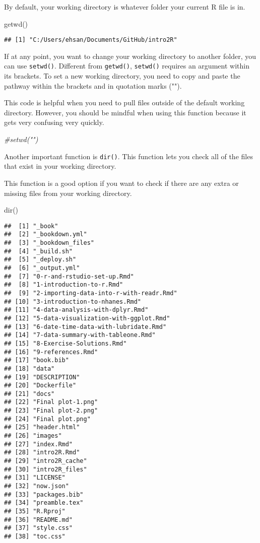 \documentclass[
]{book}
\newenvironment{Shaded}{\begin{snugshade}}{\end{snugshade}}
\newcommand{\CommentTok}[1]{\textcolor[rgb]{0.56,0.35,0.01}{\textit{#1}}}
\newcommand{\FunctionTok}[1]{\textcolor[rgb]{0.00,0.00,0.00}{#1}}
\newcommand{\NormalTok}[1]{#1}
\begin{document}
By default, your working directory is whatever folder your current R file is in.

\begin{Shaded}
\begin{Highlighting}[]
\FunctionTok{getwd}\NormalTok{()}
\end{Highlighting}
\end{Shaded}

\begin{verbatim}
## [1] "C:/Users/ehsan/Documents/GitHub/intro2R"
\end{verbatim}

If at any point, you want to change your working directory to another folder, you can use \texttt{setwd()}. Different from \texttt{getwd()}, \texttt{setwd()} requires an argument within its brackets. To set a new working directory, you need to copy and paste the pathway within the brackets and in quotation marks ("").

This code is helpful when you need to pull files outside of the default working directory. However, you should be mindful when using this function because it gets very confusing very quickly.

\begin{Shaded}
\begin{Highlighting}[]
\CommentTok{\#setwd("")}
\end{Highlighting}
\end{Shaded}

Another important function is \texttt{dir()}. This function lets you check all of the files that exist in your working directory.

This function is a good option if you want to check if there are any extra or missing files from your working directory.

\begin{Shaded}
\begin{Highlighting}[]
\FunctionTok{dir}\NormalTok{()}
\end{Highlighting}
\end{Shaded}

\begin{verbatim}
##  [1] "_book"
##  [2] "_bookdown.yml"
##  [3] "_bookdown_files"
##  [4] "_build.sh"
##  [5] "_deploy.sh"
##  [6] "_output.yml"
##  [7] "0-r-and-rstudio-set-up.Rmd"
##  [8] "1-introduction-to-r.Rmd"
##  [9] "2-importing-data-into-r-with-readr.Rmd"
## [10] "3-introduction-to-nhanes.Rmd"
## [11] "4-data-analysis-with-dplyr.Rmd"
## [12] "5-data-visualization-with-ggplot.Rmd"
## [13] "6-date-time-data-with-lubridate.Rmd"
## [14] "7-data-summary-with-tableone.Rmd"
## [15] "8-Exercise-Solutions.Rmd"
## [16] "9-references.Rmd"
## [17] "book.bib"
## [18] "data"
## [19] "DESCRIPTION"
## [20] "Dockerfile"
## [21] "docs"
## [22] "Final plot-1.png"
## [23] "Final plot-2.png"
## [24] "Final plot.png"
## [25] "header.html"
## [26] "images"
## [27] "index.Rmd"
## [28] "intro2R.Rmd"
## [29] "intro2R_cache"
## [30] "intro2R_files"
## [31] "LICENSE"
## [32] "now.json"
## [33] "packages.bib"
## [34] "preamble.tex"
## [35] "R.Rproj"
## [36] "README.md"
## [37] "style.css"
## [38] "toc.css"
\end{verbatim}
\end{document}
